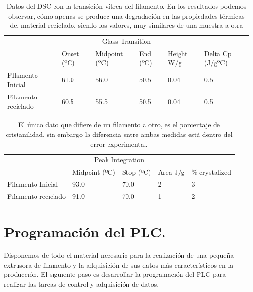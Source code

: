 \begin{table}[H]
    \centering
    \begin{tabular}{llllll}
        \multicolumn{6}{c}{Glass Transition}                                                        \\
                            & Onset (ºC) & Midpoint (ºC) & End (ºC) & Height W/g & Delta Cp (J/gºC) \\ \hline
        FIlamento Inicial   & 61.0      & 56.0         & 50.5    & 0.04    & 0.5           \\
        Filamento reciclado & 60.5     & 55.5         & 50.5    & 0.04    & 0.5         
    \end{tabular}
    \caption[Datos del DSC con la transición vítrea del filamento.]{Datos del DSC con la transición vítrea del filamento. En los resultados podemos observar, cómo apenas se produce una degradación en las propiedades térmicas del material reciclado, siendo los valores, muy similares de una muestra a otra}
    \label{tab:dsc1}
\end{table} 

\begin{table}[H]
    \centering
    \begin{tabular}{lllll}
        \multicolumn{5}{c}{Peak Integration}                                                                                 \\
                             & Midpoint (ºC) & Stop (ºC) & Area J/g   &  \% crystalized \\ \hline
        Filamento Inicial    & 93.0         & 70.0     & 2   &  3                         \\
        Filamento reciclado  & 91.0        & 70.0     & 1    & 2                        
    \end{tabular}
    \caption[Datos del DSC con la cristanilidad del filamento]{El único dato que difiere de un filamento a otro, es el porcentaje de cristanilidad, sin embargo la diferencia entre ambas medidas está dentro del error experimental.}
    \label{tab:dsc2}
\end{table}


\section{Programación del PLC.}

Disponemos de todo el material necesario para la realización de una pequeña extrusora de filamento y la adquisición de sus datos más característicos en la producción. El siguiente paso es desarrollar la programación del PLC para realizar las tareas de control y adquisición de datos.

